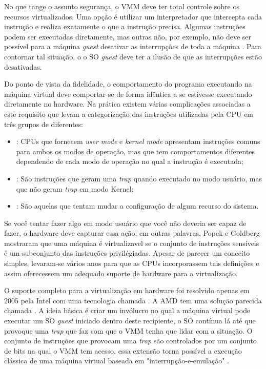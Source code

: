 No que tange o assunto segurança, o VMM deve ter total controle sobre os
recursos virtualizados. Uma opção é utilizar um interpretador que intercepta
cada instrução e realiza exatamente o que a instrução precisa. Algumas
instruções podem ser executadas diretamente, mas outras não, por exemplo, não
deve ser possível para a máquina \emph{guest} desativar as interrupções de toda
a máquina \cite{tanenbaum}. Para contornar tal situação, o o SO \emph{guest}
deve ter a ilusão de que as interrupções estão desativadas.

Do ponto de vista da fidelidade, o comportamento do programa executando na
máquina virtual deve comportar-se de forma idêntica a se estivesse executando
diretamente no hardware. Na prática existem várias complicações associadas a
este requisito que levam a categorização das instruções utilizadas pela CPU em
três grupos de diferentes:

\begin{itemize}
  \item {}: CPUs que fornecem \emph{user mode} e
        \emph{kernel mode} apresentam instruções comuns para ambos os modos de
        operação, mas que tem comportamentos diferentes dependendo de cada modo
        de operação no qual a instrução é executada;
  \item {}: São instruções que geram uma
        \emph{trap} quando executado no modo usuário, mas que não geram
        \emph{trap} em modo Kernel;
  \item {}: São aquelas que
        tentam mudar a configuração de algum recurso do sistema.
\end{itemize}

Se você tentar fazer algo em modo usuário que você não deveria ser capaz de
fazer, o hardware deve capturar essa ação; em outras palavras, Popek e Goldberg
mostraram que uma máquina é virtualizavel se o conjunto de instruções sensíveis
é um subconjunto das instruções privilégiadas. Apesar de parecer um conceito
simples, levaram-se vários anos para que as CPUs incorporassem tais definições
e assim oferecessem um adequado suporte de hardware para a virtualização.

O suporte completo para a virtualização em hardware foi resolvido apenas em
2005 pela Intel \cite{uhlig} com uma tecnologia chamada . A AMD tem uma solução parecida chamada . A ideia básica é criar um invólucro no qual a máquina
virtual pode executar um SO \emph{guest} iniciado dentro deste recipiente, o SO
contínua lá até que provoque uma \emph{trap} que faz com que o VMM tenha que
lidar com a situação. O conjunto de instruções que provocam uma \emph{trap} são
controlados por um conjunto de bits na qual o VMM tem acesso, essa extensão
torna possível a execução clássica de uma máquina virtual baseada em
"interrupção-e-emulação" \cite{tanenbaum}.

